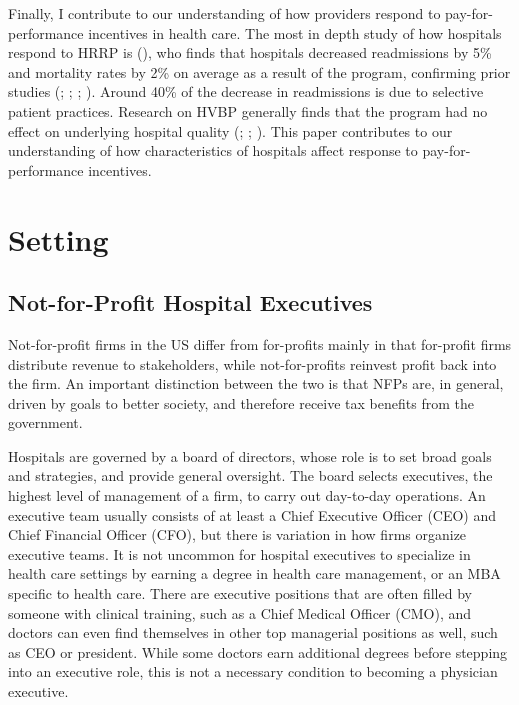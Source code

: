 \documentclass[12pt]{article}
\begin{document}
    Finally, I contribute to our understanding of how providers respond to pay-for-performance incentives in health care. The most in depth study of how hospitals respond to HRRP is \citeauthor{gupta2021impacts} (\citeyear{gupta2021impacts}), who finds that hospitals decreased readmissions by 5\% and mortality rates by 2\% on average as a result of the program, confirming prior studies (\cite{mellor2017does}; \cite{ziedan2018essays}; \cite{ody2019decreases}; \cite{gupta2021impacts}). Around 40\% of the decrease in readmissions is due to selective patient practices. Research on HVBP generally finds that the program had no effect on underlying hospital quality (\cite{us2015hospital}; \cite{norton2018moneyball}; \cite{friedson2019so}). This paper contributes to our understanding of how characteristics of hospitals affect response to pay-for-performance incentives. 

    

    \section{Setting}

    \subsection{Not-for-Profit Hospital Executives}

    Not-for-profit firms in the US differ from for-profits mainly in that for-profit firms distribute revenue to stakeholders, while not-for-profits reinvest profit back into the firm. An important distinction between the two is that NFPs are, in general, driven by goals to better society, and therefore receive tax benefits from the government.
    
    Hospitals are governed by a board of directors, whose role is to set broad goals and strategies, and provide general oversight. The board selects executives, the highest level of management of a firm, to carry out day-to-day operations. An executive team usually consists of at least a Chief Executive Officer (CEO) and Chief Financial Officer (CFO), but there is variation in how firms organize executive teams. It is not uncommon for hospital executives to specialize in health care settings by earning a degree in health care management, or an MBA specific to health care. There are executive positions that are often filled by someone with clinical training, such as a Chief Medical Officer (CMO), and doctors can even find themselves in other top managerial positions as well, such as CEO or president. While some doctors earn additional degrees before stepping into an executive role, this is not a necessary condition to becoming a physician executive. 
\end{document}

